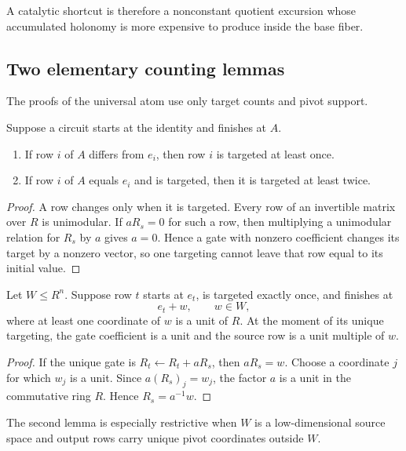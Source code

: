 A catalytic shortcut is therefore a nonconstant quotient excursion whose accumulated holonomy is more expensive to produce inside the base fiber.

\subsection{Two elementary counting lemmas}

The proofs of the universal atom use only target counts and pivot support.

\begin{lemma}\label{g:lem:target-count}
Suppose a circuit starts at the identity and finishes at $A$.
\begin{enumerate}[label=\textup{(\roman*)}]
\item If row $i$ of $A$ differs from $e_i$, then row $i$ is targeted at least once.
\item If row $i$ of $A$ equals $e_i$ and is targeted, then it is targeted at least twice.
\end{enumerate}
\end{lemma}

\begin{proof}
A row changes only when it is targeted.  Every row of an invertible matrix over $R$ is unimodular.  If $aR_s=0$ for such a row, then multiplying a unimodular relation for $R_s$ by $a$ gives $a=0$.  Hence a gate with nonzero coefficient changes its target by a nonzero vector, so one targeting cannot leave that row equal to its initial value.
\end{proof}

\begin{lemma}\label{g:lem:one-target-source}
Let $W\le R^n$.  Suppose row $t$ starts at $e_t$, is targeted exactly once, and finishes at
\[
e_t+w,
\qquad w\in W,
\]
where at least one coordinate of $w$ is a unit of $R$.  At the moment of its unique targeting, the gate coefficient is a unit and the source row is a unit multiple of $w$.
\end{lemma}

\begin{proof}
If the unique gate is $R_t\leftarrow R_t+aR_s$, then $aR_s=w$.  Choose a coordinate $j$ for which $w_j$ is a unit.  Since $a(R_s)_j=w_j$, the factor $a$ is a unit in the commutative ring $R$.  Hence $R_s=a^{-1}w$.
\end{proof}

The second lemma is especially restrictive when $W$ is a low-dimensional source space and output rows carry unique pivot coordinates outside $W$.

